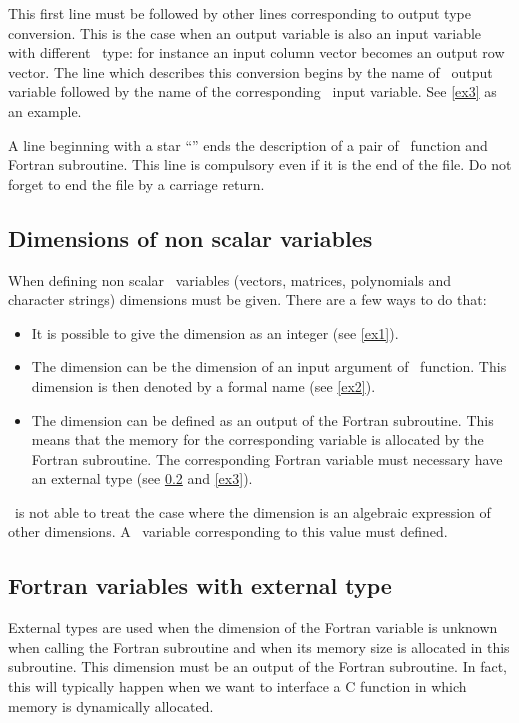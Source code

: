 \documentclass[11pt]{article}
\begin{document}
This first line must be followed by other lines corresponding to output type
conversion. This is the case when an output variable is also an input variable
with different \SCI\ type: for instance an input column vector becomes an
output row vector. The line which describes this conversion begins by the name
of \SCI\ output variable followed by the name of the corresponding \SCI\ input
variable. See \ref{ex3} as an example.
\medskip

A line beginning with a star ``\T{*}'' ends the description of a pair of
\SCI\ function and Fortran subroutine. This line is compulsory even if it is
the end of the file. Do not forget to end the file by a carriage return.

\subsection{Dimensions of non scalar variables}
\label{dimensions}

When defining non scalar \SCI\ variables (vectors, matrices, polynomials and
character strings) dimensions must be given. There are a few ways to do that:

\begin{itemize}
  \item It is possible to give the dimension as an integer (see \ref{ex1}).
  \item The dimension can be the dimension of an input argument of \SCI\
function. This dimension is then denoted by a formal name (see \ref{ex2}). 
  \item The dimension can be defined as an output of the Fortran subroutine.
This means that the memory for the corresponding variable is allocated by the
Fortran subroutine. The corresponding Fortran variable must necessary have an
external type (see \ref{external} and \ref{ex3}).
\end{itemize}

\ISCI\ is not able to treat the case where the dimension is an algebraic
expression of other dimensions. A \SCI\ variable corresponding to this value
must defined.

\subsection{Fortran variables with external type}
\label{external}

External types are used when the dimension of the Fortran variable is
unknown when calling the Fortran subroutine and when its memory size is
allocated in this subroutine. This dimension must be an output of the Fortran
subroutine. In fact, this will typically happen when we want to interface a C
function in which memory is dynamically allocated.
\end{document}
